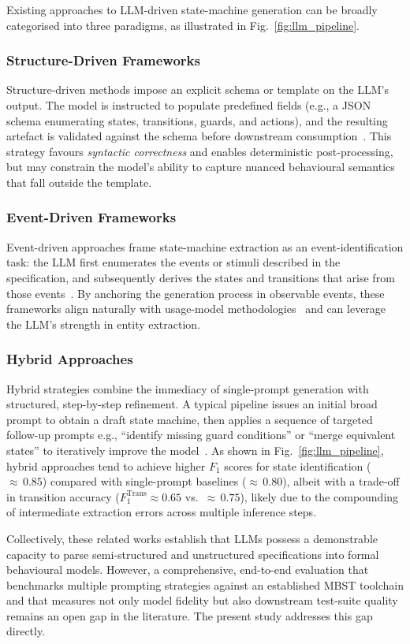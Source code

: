 Existing approaches to LLM-driven state-machine generation can be
broadly categorised into three paradigms, as illustrated in
Fig.~\ref{fig:llm_pipeline}.

\subsubsection{Structure-Driven Frameworks}
Structure-driven methods impose an explicit schema or template on the
LLM's output. The model is instructed to populate predefined fields
(e.g., a JSON schema enumerating states, transitions, guards, and
actions), and the resulting artefact is validated against the schema
before downstream consumption~\cite{llm_state_machine_frameworks}. This
strategy favours \emph{syntactic correctness} and enables deterministic
post-processing, but may constrain the model's ability to capture
nuanced behavioural semantics that fall outside the template.

\subsubsection{Event-Driven Frameworks}
Event-driven approaches frame state-machine extraction as an
event-identification task: the LLM first enumerates the events or stimuli
described in the specification, and subsequently derives the states and
transitions that arise from those events~\cite{boundary_value_llm}. By
anchoring the generation process in observable events, these frameworks
align naturally with usage-model methodologies~\cite{usage_model_web,
nap_statistics} and can leverage the LLM's strength in entity extraction.

\subsubsection{Hybrid Approaches}
Hybrid strategies combine the immediacy of single-prompt generation with
structured, step-by-step refinement. A typical pipeline issues an
initial broad prompt to obtain a draft state machine, then applies a
sequence of targeted follow-up prompts e.g., ``identify missing guard
conditions'' or ``merge equivalent states'' to iteratively improve the
model~\cite{llm_state_machine_frameworks}. As shown in
Fig.~\ref{fig:llm_pipeline}, hybrid approaches tend to achieve higher
$F_1$ scores for state identification (${\approx}\,0.85$) compared with
single-prompt baselines (${\approx}\,0.80$), albeit with a trade-off in
transition accuracy ($F_1^{\mathrm{Trans}} \approx 0.65$ vs.\
${\approx}\,0.75$), likely due to the compounding of intermediate
extraction errors across multiple inference steps.

\medskip
Collectively, these related works establish that LLMs possess a
demonstrable capacity to parse semi-structured and unstructured
specifications into formal behavioural models. However, a comprehensive,
end-to-end evaluation that benchmarks multiple prompting strategies
against an established MBST toolchain and that measures not only model
fidelity but also downstream test-suite quality remains an open gap in
the literature. The present study addresses this gap directly.

